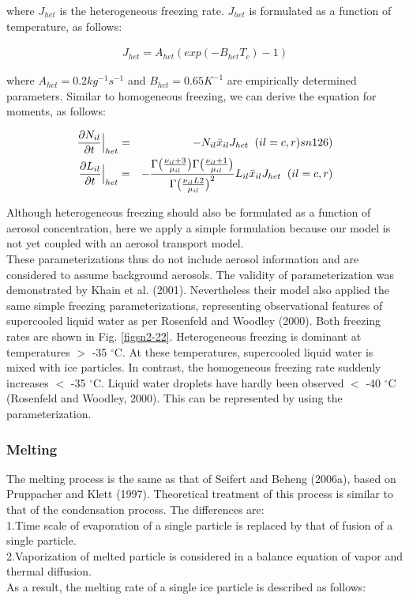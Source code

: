 where $J_{het}$ is the heterogeneous freezing rate. $J_{het}$ is formulated as a function of temperature, as follows:

\begin{eqnarray}
J_{het}=A_{het}(exp(-B_{het}T_{c})-1)\label{sn125}
\end{eqnarray}

where $A_{het}=0.2kg^{-1}s^{-1}$ and $B_{het}=0.65K^{-1}$ are empirically determined parameters. Similar to homogeneous freezing, we can derive the equation for moments, as follows:

\begin{eqnarray}
\frac{\partial N_{il}}{\partial t}\Bigr|_{het}&=&-N_{il}\bar{x}_{il}J_{het}\;\;(il=c,r)\label(sn126)\\
\frac{\partial L_{il}}{\partial t}\Bigr|_{het}&=&-\frac{\Gamma\bigl(\frac{\nu_{il}+3}{\mu_{il}}\bigr)\Gamma\bigl(\frac{\nu_{il}+1}{\mu_{il}}\bigr)}{\Gamma\bigl(\frac{\nu_{il}L2}{\mu_{il}}\bigr)^{2}}L_{il}\bar{x}_{il}J_{het}\;\;(il=c,r)\label{sn127}
\end{eqnarray}

Although heterogeneous freezing should also be formulated as a function of aerosol concentration, here we apply a simple formulation because our model is not yet coupled with an aerosol transport model.\\
These parameterizations thus do not include aerosol information and are considered to assume background aerosols. The validity of parameterization was demonstrated by Khain et al. (2001). Nevertheless their model also applied the same simple freezing parameterizations, representing observational features of supercooled liquid water as per Rosenfeld and Woodley (2000). Both freezing rates are shown in Fig. \ref{figsn2-22}. Heterogeneous freezing is dominant at temperatures $>$ -35 $^\circ$C. At these temperatures, supercooled liquid water is mixed with ice particles. In contrast, the homogeneous freezing rate suddenly increases $<$ -35 $^\circ$C. Liquid water droplets have hardly been observed $<$ -40 $^\circ$C (Rosenfeld and Woodley, 2000). This can be represented by using the parameterization.

\subsubsection{Melting}
The melting process is the same as that of Seifert and Beheng (2006a), based on Pruppacher and Klett (1997). Theoretical treatment of this process is similar to that of the condensation process. The differences are:\\
1.Time scale of evaporation of a single particle is replaced by that of fusion of a single particle.\\
2.Vaporization of melted particle is considered in a balance equation of vapor and thermal diffusion.\\
As a result, the melting rate of a single ice particle is described as follows:

